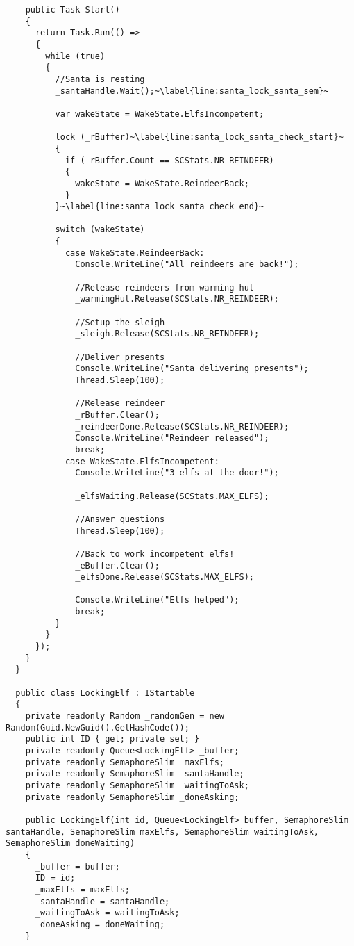 \begin{lstlisting}
    public Task Start()
    {
      return Task.Run(() =>
      {
        while (true)
        {
          //Santa is resting
          _santaHandle.Wait();~\label{line:santa_lock_santa_sem}~

          var wakeState = WakeState.ElfsIncompetent;

          lock (_rBuffer)~\label{line:santa_lock_santa_check_start}~
          {
            if (_rBuffer.Count == SCStats.NR_REINDEER)
            {
              wakeState = WakeState.ReindeerBack;    
            }
          }~\label{line:santa_lock_santa_check_end}~

          switch (wakeState)
          {
            case WakeState.ReindeerBack:
              Console.WriteLine("All reindeers are back!");

              //Release reindeers from warming hut
              _warmingHut.Release(SCStats.NR_REINDEER);

              //Setup the sleigh
              _sleigh.Release(SCStats.NR_REINDEER);

              //Deliver presents
              Console.WriteLine("Santa delivering presents");
              Thread.Sleep(100);

              //Release reindeer
              _rBuffer.Clear();
              _reindeerDone.Release(SCStats.NR_REINDEER);
              Console.WriteLine("Reindeer released");
              break;
            case WakeState.ElfsIncompetent:
              Console.WriteLine("3 elfs at the door!");

              _elfsWaiting.Release(SCStats.MAX_ELFS);

              //Answer questions
              Thread.Sleep(100);

              //Back to work incompetent elfs!
              _eBuffer.Clear();
              _elfsDone.Release(SCStats.MAX_ELFS);

              Console.WriteLine("Elfs helped");
              break;
          }
        }
      });
    }
  }
  
  public class LockingElf : IStartable
  {
    private readonly Random _randomGen = new Random(Guid.NewGuid().GetHashCode());
    public int ID { get; private set; }
    private readonly Queue<LockingElf> _buffer;
    private readonly SemaphoreSlim _maxElfs;
    private readonly SemaphoreSlim _santaHandle;
    private readonly SemaphoreSlim _waitingToAsk;
    private readonly SemaphoreSlim _doneAsking;

    public LockingElf(int id, Queue<LockingElf> buffer, SemaphoreSlim santaHandle, SemaphoreSlim maxElfs, SemaphoreSlim waitingToAsk, SemaphoreSlim doneWaiting)
    {
      _buffer = buffer;
      ID = id;
      _maxElfs = maxElfs;
      _santaHandle = santaHandle;
      _waitingToAsk = waitingToAsk;
      _doneAsking = doneWaiting;
    }


\end{lstlisting}
